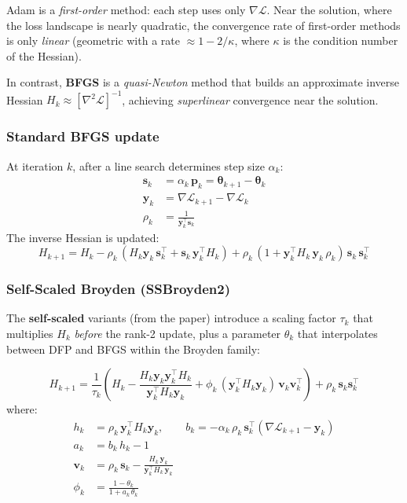 \documentclass[11pt,a4paper]{article}
\begin{document}
Adam is a \emph{first-order} method: each step uses only $\nabla\mathcal{L}$.
Near the solution, where the loss landscape is nearly quadratic, the
convergence rate of first-order methods is only \emph{linear} (geometric
with a rate $\approx 1 - 2/\kappa$, where $\kappa$ is the condition number
of the Hessian).

In contrast, \textbf{BFGS} is a \emph{quasi-Newton} method that
builds an approximate inverse Hessian $H_k \approx
[\nabla^2 \mathcal{L}]^{-1}$, achieving \emph{superlinear} convergence
near the solution.

\subsubsection*{Standard BFGS update}

At iteration $k$, after a line search determines step size $\alpha_k$:
\begin{align}
  \bm{s}_k &= \alpha_k\,\bm{p}_k = \bm\theta_{k+1} - \bm\theta_k \\
  \bm{y}_k &= \nabla\mathcal{L}_{k+1} - \nabla\mathcal{L}_k \\
  \rho_k   &= \frac{1}{\bm{y}_k^\top \bm{s}_k}
\end{align}
The inverse Hessian is updated:
\begin{equation}
  H_{k+1} = H_k
  - \rho_k\,(H_k \bm{y}_k\,\bm{s}_k^\top + \bm{s}_k\,\bm{y}_k^\top H_k)
  + \rho_k\,(1 + \bm{y}_k^\top H_k\,\bm{y}_k\,\rho_k)\,
    \bm{s}_k\,\bm{s}_k^\top
\label{eq:bfgs}
\end{equation}

\subsubsection*{Self-Scaled Broyden (SSBroyden2)}

The \textbf{self-scaled} variants (from the paper) introduce a scaling
factor $\tau_k$ that multiplies $H_k$ \emph{before} the rank-2 update,
plus a parameter $\theta_k$ that interpolates between DFP and BFGS
within the Broyden family:

\begin{equation}
  H_{k+1} = \frac{1}{\tau_k}\left(
    H_k
    - \frac{H_k\bm{y}_k\bm{y}_k^\top H_k}{\bm{y}_k^\top H_k\bm{y}_k}
    + \phi_k\,(\bm{y}_k^\top H_k\bm{y}_k)\,\bm{v}_k\bm{v}_k^\top
  \right)
  + \rho_k\,\bm{s}_k\bm{s}_k^\top
\label{eq:ssbroyden}
\end{equation}
where:
\begin{align}
  h_k &= \rho_k\,\bm{y}_k^\top H_k\bm{y}_k,
  \qquad
  b_k = -\alpha_k\,\rho_k\,\bm{s}_k^\top(\nabla\mathcal{L}_{k+1} - \bm{y}_k) \\
  a_k &= b_k\,h_k - 1 \label{eq:ak}\\
  \bm{v}_k &= \rho_k\,\bm{s}_k
    - \frac{H_k\,\bm{y}_k}{\bm{y}_k^\top H_k\,\bm{y}_k}
  \label{eq:vk}\\
  \phi_k &= \frac{1 - \theta_k}{1 + a_k\,\theta_k}
  \label{eq:phik}
\end{align}
\end{document}
